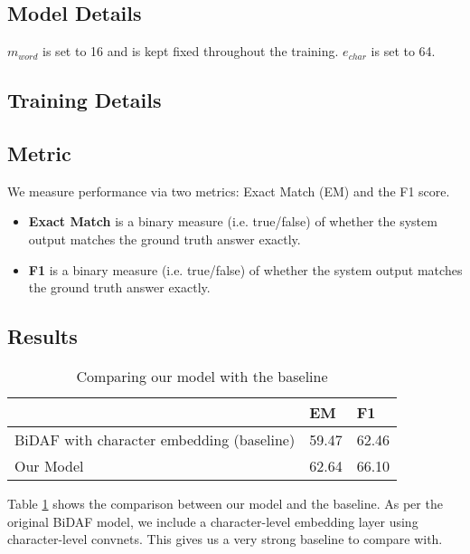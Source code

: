 \subsection{Model Details}
\label{subsec:modeldetails}

$m_{word}$ is set to 16 and is kept fixed throughout the training. ${e_{char}}$ is set to 64.

\subsection{Training Details}
\label{subsec:trainingdetails}

\subsection{Metric}
\label{subsec:metric}

We measure performance via two metrics: Exact Match (EM) and the F1 score.

\begin{itemize}
\item \textbf{Exact Match} is a binary measure (i.e. true/false) of whether the system output matches the ground truth answer exactly.

\item \textbf{F1} is a binary measure (i.e. true/false) of whether the system output matches the ground truth answer exactly.

\end{itemize}

\subsection{Results}
\label{subsec:results}

\begin{table}[]
\caption{Comparing our model with the baseline}
\label{table:results}
\centering
\begin{tabular}{lll}
																									& EM    & F1    \\ \hline
BiDAF with character embedding (baseline)				  & 59.47 & 62.46 \\
Our Model																					& 62.64 & 66.10 \\ \hline

\end{tabular}
\end{table}

Table \ref{table:results} shows the comparison between our model and the baseline. As per the original BiDAF model, we include a character-level embedding layer using character-level convnets. This gives us a very strong baseline to compare with.


